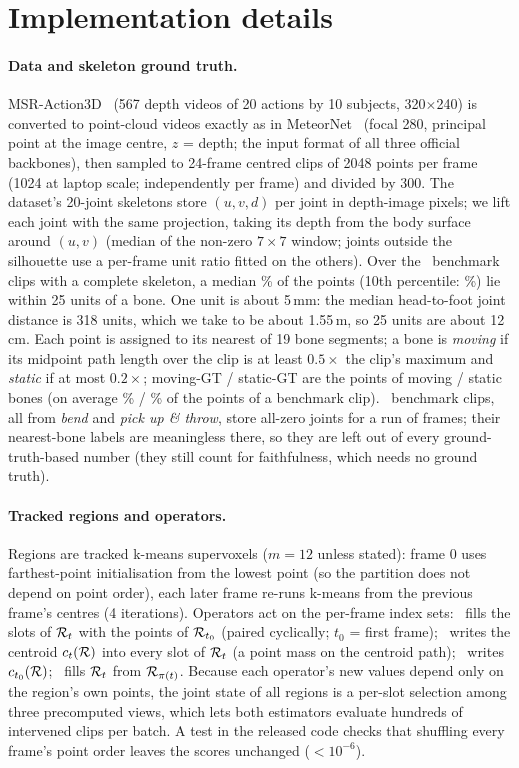 \section{Implementation details}
\label{supp:impl}
\paragraph{Data and skeleton ground truth.}
MSR-Action3D~\cite{li2010msraction3d} (567 depth videos of 20 actions by 10 subjects, 320$\times$240) is converted to point-cloud videos exactly as in MeteorNet~\cite{liu2019meteornet} (focal 280, principal point at the image centre, $z$ = depth; the input format of all three official backbones), then sampled to 24-frame centred clips of 2048 points per frame (1024 at laptop scale; independently per frame) and divided by 300. The dataset's 20-joint skeletons store $(u,v,d)$ per joint in depth-image pixels; we lift each joint with the same projection, taking its depth from the body surface around $(u,v)$ (median of the non-zero $7{\times}7$ window; joints outside the silhouette use a per-frame unit ratio fitted on the others). Over the \NumGTValid\ benchmark clips with a complete skeleton, a median \NumGTFitMedian\% of the points (10th percentile: \NumGTFitPten\%) lie within 25 units of a bone. One unit is about 5\,mm: the median head-to-foot joint distance is 318 units, which we take to be about 1.55\,m, so 25 units are about 12\,cm. Each point is assigned to its nearest of 19 bone segments; a bone is \emph{moving} if its midpoint path length over the clip is at least $0.5\times$ the clip's maximum and \emph{static} if at most $0.2\times$; moving-GT / static-GT are the points of moving / static bones (on average \NumGTMovingPct\% / \NumGTStaticPct\% of the points of a benchmark clip). \NumGTMissing\ benchmark clips, all from \emph{bend} and \emph{pick up \& throw}, store all-zero joints for a run of frames; their nearest-bone labels are meaningless there, so they are left out of every ground-truth-based number (they still count for faithfulness, which needs no ground truth).

\paragraph{Tracked regions and operators.}
Regions are tracked k-means supervoxels ($m{=}12$ unless stated): frame 0 uses farthest-point initialisation from the lowest point (so the partition does not depend on point order), each later frame re-runs k-means from the previous frame's centres (4 iterations). Operators act on the per-frame index sets: \frz\ fills the slots of $\mathcal{R}_t$ with the points of $\mathcal{R}_{t_0}$ (paired cyclically; $t_0$ = first frame); \ablgeo\ writes the centroid $c_t(\mathcal{R})$ into every slot of $\mathcal{R}_t$ (a point mass on the centroid path); \abl\ writes $c_{t_0}(\mathcal{R})$; \dsp\ fills $\mathcal{R}_t$ from $\mathcal{R}_{\pi(t)}$. Because each operator's new values depend only on the region's own points, the joint state of all regions is a per-slot selection among three precomputed views, which lets both estimators evaluate hundreds of intervened clips per batch. A test in the released code checks that shuffling every frame's point order leaves the scores unchanged ($<10^{-6}$).

